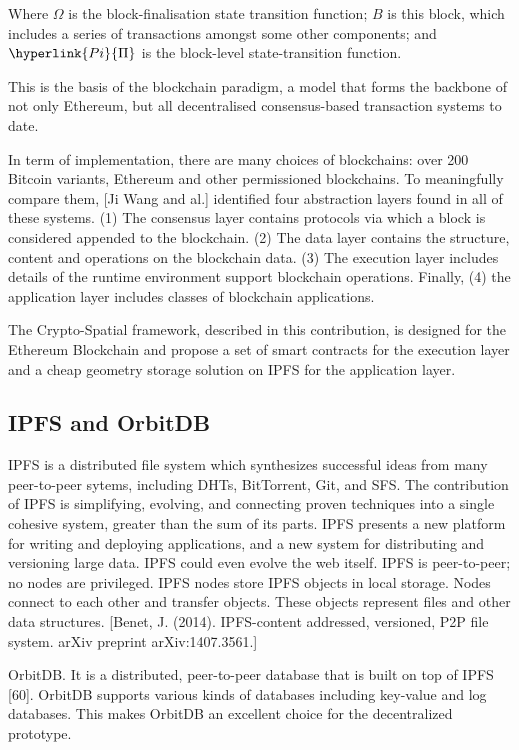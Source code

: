 \documentclass{isprs} %
\begin{document}
Where \hyperlink{Omega}{$\Omega$} is the block-finalisation state transition function; \hyperlink{block}{$B$} is this block, which includes a series of transactions amongst some other components; and $\hyperlink{Pi}{\Pi}$ is the block-level state-transition function.

This is the basis of the blockchain paradigm, a model that forms the backbone of not only Ethereum, but all decentralised consensus-based transaction systems to date.

In term of implementation, there are many choices of blockchains: over 200 Bitcoin variants, Ethereum and other permissioned blockchains. To meaningfully compare them, [Ji Wang and al.] identified four abstraction layers found in all of these systems. (1) The consensus layer contains protocols via which a block is considered appended to the blockchain. (2) The data layer contains the structure, content and operations on the blockchain data. (3) The execution layer includes details of the runtime environment support blockchain operations. Finally, (4) the application layer includes classes of blockchain applications. 

The Crypto-Spatial framework, described in this contribution, is designed for the Ethereum Blockchain and propose a set of smart contracts for the execution layer and a cheap geometry storage solution on IPFS for the application layer.

\subsection{IPFS and OrbitDB}\label{sec:IPFS and OrbitDB}

IPFS is a distributed file system which synthesizes successful ideas from many peer-to-peer sytems, including DHTs, BitTorrent, Git, and SFS. The contribution of IPFS is simplifying, evolving, and connecting proven techniques into a single cohesive system, greater than the sum of its parts. IPFS presents a new platform for writing and deploying applications, and a new system for distributing and versioning large data. IPFS could even evolve the web itself. IPFS is peer-to-peer; no nodes are privileged. IPFS nodes store IPFS objects in local storage. Nodes connect to each other and transfer objects. These objects represent files and other data structures. [Benet, J. (2014). IPFS-content addressed, versioned, P2P file system. arXiv preprint arXiv:1407.3561.]

OrbitDB. It is a distributed, peer-to-peer database that is built on top of IPFS [60]. OrbitDB supports various kinds of databases including key-value and log databases. This makes OrbitDB an excellent choice for the decentralized prototype. 
\end{document}
